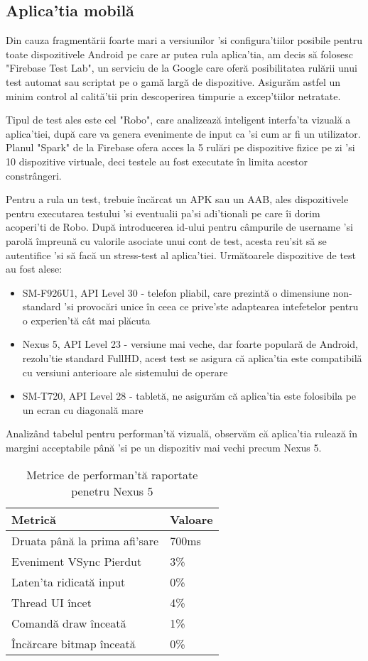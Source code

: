 \subsection {Aplica'tia mobilă}

Din cauza fragmentării foarte mari a versiunilor 'si configura'tiilor posibile pentru toate dispozitivele Android pe care ar putea rula aplica'tia, am decis să folosesc "Firebase Test Lab", un serviciu de la Google care oferă posibilitatea rulării unui test automat sau scriptat pe o gamă largă de dispozitive. 
Asigurăm astfel un minim control al calită'tii prin descoperirea timpurie a excep'tiilor netratate.

Tipul de test ales este cel "Robo", care analizează inteligent interfa'ta vizuală a aplica'tiei, după care va genera evenimente de input ca 'si cum ar fi un utilizator. Planul "Spark" de la Firebase ofera acces la 5 rulări pe dispozitive fizice pe zi 'si 10 dispozitive virtuale, deci testele au fost executate în limita acestor constrângeri. 

Pentru a rula un test, trebuie încărcat un APK sau un AAB, ales dispozitivele pentru executarea testului 'si eventualii pa'si adi'tionali pe care îi dorim acoperi'ti de Robo. După introducerea id-ului pentru câmpurile de username 'si parolă împreună cu valorile asociate unui cont de test, acesta reu'sit să se autentifice 'si să facă un stress-test al aplica'tiei. Următoarele dispozitive de test au fost alese:

\begin{itemize}
  \item SM-F926U1, API Level 30 - telefon pliabil, care prezintă o dimensiune non-standard 'si provocări unice în ceea ce prive'ste adaptearea intefetelor pentru o experien'tă cât mai plăcuta
  \item Nexus 5, API Level 23 - versiune mai veche, dar foarte populară de Android, rezolu'tie standard FullHD, acest test se asigura că aplica'tia este compatibilă cu versiuni anterioare ale sistemului de operare
  \item SM-T720, API Level 28 - tabletă, ne asigurăm că aplica'tia este folosibila pe un ecran cu diagonală mare
\end{itemize}

Analizând tabelul pentru performan'tă vizuală, observăm că aplica'tia rulează în margini acceptabile până 'si pe un dispozitiv mai vechi precum Nexus 5.

\begin{table}[ht!]
\begin{tabular}{ll}
\hline
Metrică &  Valoare \\ 
\hline
\hline
Druata până la prima afi'sare & 700ms \\
Eveniment VSync Pierdut & 3\% \\
Laten'ta ridicată input & 0\% \\
Thread UI încet & 4\% \\
Comandă draw înceată & 1\% \\
Încărcare bitmap înceată & 0\% \\
\hline
\end{tabular}
\centering
\caption{Metrice de performan'tă raportate penetru Nexus 5}
\label{tab:metrics}
\end{table}

